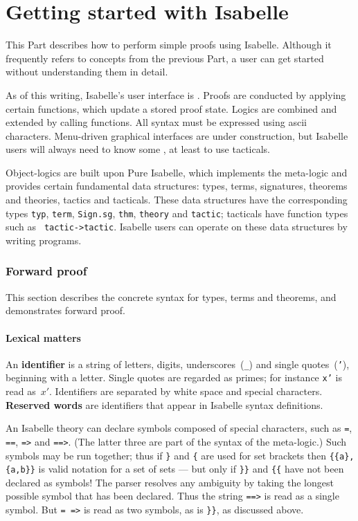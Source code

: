 \part{Getting started with Isabelle}
This Part describes how to perform simple proofs using Isabelle.  Although
it frequently refers to concepts from the previous Part, a user can get
started without understanding them in detail.

As of this writing, Isabelle's user interface is \ML.  Proofs are conducted
by applying certain \ML{} functions, which update a stored proof state.
Logics are combined and extended by calling \ML{} functions.  All syntax
must be expressed using {\sc ascii} characters.  Menu-driven graphical
interfaces are under construction, but Isabelle users will always need to
know some \ML, at least to use tacticals.

Object-logics are built upon Pure Isabelle, which implements the meta-logic
and provides certain fundamental data structures: types, terms, signatures,
theorems and theories, tactics and tacticals.  These data structures have
the corresponding \ML{} types {\tt typ}, {\tt term}, {\tt Sign.sg}, {\tt thm},
{\tt theory} and {\tt tactic}; tacticals have function types such as {\tt
tactic->tactic}.  Isabelle users can operate on these data structures by
writing \ML{} programs.

\section{Forward proof}
This section describes the concrete syntax for types, terms and theorems,
and demonstrates forward proof.

\subsection{Lexical matters}
An {\bf identifier} is a string of letters, digits, underscores~(\verb|_|)
and single quotes~({\tt'}), beginning with a letter.  Single quotes are
regarded as primes; for instance {\tt x'} is read as~$x'$.  Identifiers are
separated by white space and special characters.  {\bf Reserved words} are
identifiers that appear in Isabelle syntax definitions.

An Isabelle theory can declare symbols composed of special characters, such
as {\tt=}, {\tt==}, {\tt=>} and {\tt==>}.  (The latter three are part of
the syntax of the meta-logic.)  Such symbols may be run together; thus if
\verb|}| and \verb|{| are used for set brackets then \verb|{{a},{a,b}}| is
valid notation for a set of sets --- but only if \verb|}}| and \verb|{{|
have not been declared as symbols!  The parser resolves any ambiguity by
taking the longest possible symbol that has been declared.  Thus the string
{\tt==>} is read as a single symbol.  But \hbox{\tt= =>} is read as two
symbols, as is \verb|}}|, as discussed above.

